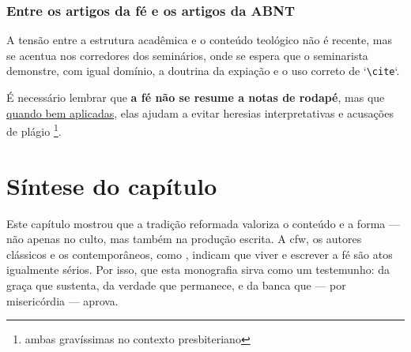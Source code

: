 \subsubsection{Entre os artigos da fé e os artigos da ABNT}

A tensão entre a estrutura acadêmica e o conteúdo teológico não é recente, mas se acentua nos corredores dos seminários, onde se espera que o seminarista demonstre, com igual domínio, a doutrina da expiação e o uso correto de `\texttt{\textbackslash cite}`. 

É necessário lembrar que \textbf{a fé não se resume a notas de rodapé}, mas que \underline{quando bem aplicadas}, elas ajudam a evitar heresias interpretativas e acusações de plágio \footnote{ambas gravíssimas no contexto presbiteriano}.

\section{Síntese do capítulo}

Este capítulo mostrou que a tradição reformada valoriza o conteúdo e a forma — não apenas no culto, mas também na produção escrita. A \gls{cfw}, os autores clássicos e os contemporâneos, como , indicam que viver e escrever a fé são atos igualmente sérios. Por isso, que esta monografia sirva como um testemunho: da graça que sustenta, da verdade que permanece, e da banca que — por misericórdia — aprova.

